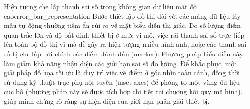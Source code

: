 \begin{pitfall}{Hiện tượng che lấp thanh sai số trong không gian dữ liệu mật độ cao}{error_bar_representation}
Bước thiết lập đồ thị đối với các mảng dữ liệu lấy mẫu tự động thường tiềm ẩn rủi ro về mặt biểu diễn thị giác. Do số lượng điểm quan trắc lớn và độ bất định thiết bị ở mức vi mô, việc rải thanh sai số trực tiếp lên toàn bộ đồ thị vĩ mô dễ gây ra hiện tượng nhiễu hình ảnh, hoặc các thanh sai số bị che lấp bởi chính các điểm đánh dấu (marker). Phương pháp biểu diễn này làm giảm khả năng nhận diện các giới hạn sai số đo lường. Để khắc phục, một giải pháp đồ họa tối ưu là duy trì việc vẽ điểm ở góc nhìn toàn cảnh, đồng thời sử dụng kỹ thuật trục phụ nội tuyến (inset axes) để phóng to một vùng dữ liệu cục bộ (phương pháp này sẽ được tích hợp chi tiết tại chương hồi quy mô hình), giúp minh chứng rõ ràng sự hiện diện của giới hạn phân giải thiết bị.
\end{pitfall}